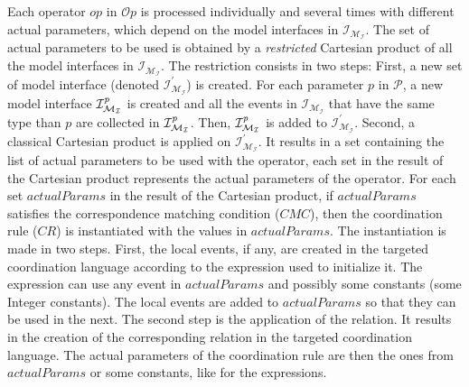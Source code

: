 %
%
Each operator $op$ in $\mathcal{O}p$ is processed individually and several times with different actual parameters, which depend on the model interfaces in $\mathcal{I_{M_I}}$. The set of actual parameters to be used is obtained by a \emph{restricted} Cartesian product of all the model interfaces in $\mathcal{I_{M_I}}$. The restriction consists in two steps: First, a new set of model interface (denoted $\mathcal{I^{'}_{M_I}}$) is created. For each parameter $p$ in $\mathcal{P}$, a new model interface $\mathcal{I^{\textit{\text{p}}}_{M_I}}$ is created and all the events in $\mathcal{I_{M_I}}$ that have the same type than $p$ are collected in $\mathcal{I^{\textit{\text{p}}}_{M_I}}$. Then, $\mathcal{I^{\textit{\text{p}}}_{M_I}}$ is added to $\mathcal{I^{'}_{M_I}}$. 
%
Second, a classical Cartesian product is applied on $\mathcal{I^{'}_{M_I}}$. It results in a set containing the list of actual parameters to be used with the operator, \ie each set in the result of the Cartesian product represents the actual parameters of the operator. 
%
For each set $actualParams$ in the result of the Cartesian product, if $actualParams$ satisfies the correspondence matching condition ($CMC$), then the coordination rule ($CR$) is instantiated with the values in $actualParams$.
%
The instantiation is made in two steps. First, the local events, if any, are created in the targeted coordination language according to the expression used to initialize it. The expression can use any event in $actualParams$ and possibly some constants (\eg some Integer constants). The local events are added to $actualParams$ so that they can be used in the next.
%
The second step is the application of the relation. It results in the creation of the corresponding relation in the targeted coordination language. The actual parameters of the coordination rule are then the ones from $actualParams$ or some constants, like for the expressions.